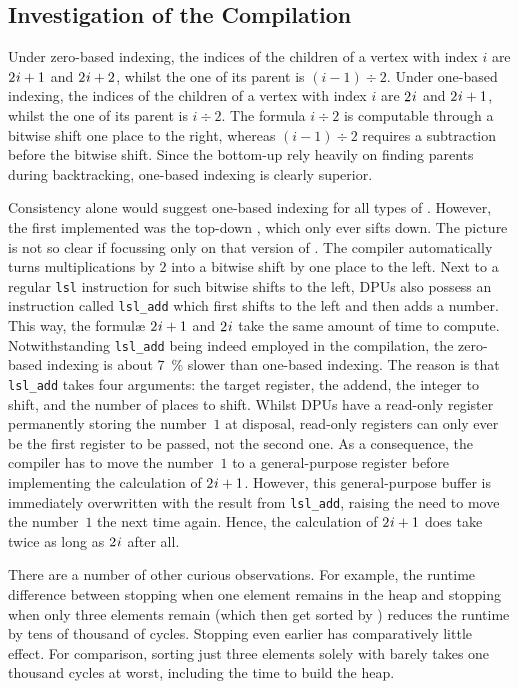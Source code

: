 \subsection{Investigation of the Compilation}
\label{sec:tasklet:heap:compilation}

Under zero-based indexing, the indices of the children of a vertex with index \(i\) are \(2 \mspace{1mu} i + 1\) and \(2 \mspace{1mu} i + 2\), whilst the one of its parent is \((i - 1) \div 2\).
Under one-based indexing, the indices of the children of a vertex with index \(i\) are \(2 \mspace{1mu} i\) and \(2 \mspace{1mu} i + 1\), whilst the one of its parent is \(i \div 2\).
The formula \(i \div 2\) is computable through a bitwise shift one place to the right, whereas \((i - 1) \div 2\) requires a subtraction before the bitwise shift.
Since the bottom-up \HS*{} rely heavily on finding parents during backtracking, one-based indexing is clearly superior.

Consistency alone would suggest one-based indexing for all types of \HS{}.
However, the first \HS{} implemented was the top-down \HS{}, which only ever sifts down.
The picture is not so clear if focussing only on that version of \HS{}.
The compiler automatically turns multiplications by \(2\) into a bitwise shift by one place to the left.
Next to a regular \lstinline|lsl| instruction for such bitwise shifts to the left, \acp{DPU} also possess an instruction called \lstinline|lsl_add| which first shifts to the left and then adds a number.
This way, the formulæ \(2 \mspace{1mu} i + 1\) and \(2 \mspace{1mu} i\) take the same amount of time to compute.
Notwithstanding \lstinline|lsl_add| being indeed employed in the compilation, the zero-based indexing is about \qty{7}{\percent} slower than one-based indexing.
The reason is that \lstinline|lsl_add| takes four arguments:
the target register, the addend, the integer to shift, and the number of places to shift.
Whilst \acp{DPU} have a read-only register permanently storing the number~\(1\) at disposal, read-only registers can only ever be the first register to be passed, not the second one.
As a consequence, the compiler has to move the number~\(1\) to a general-purpose register before implementing the calculation of \(2 \mspace{1mu} i + 1\).
However, this general-purpose buffer is immediately overwritten with the result from \lstinline|lsl_add|, raising the need to move the number~\(1\) the next time again.
Hence, the calculation of \(2 \mspace{1mu} i + 1\) does take twice as long as \(2 \mspace{1mu} i\) after all.

There are a number of other curious observations.
For example, the runtime difference between stopping \HS{} when one element remains in the heap and stopping \HS{} when only three elements remain (which then get sorted by \IS{}) reduces the runtime by tens of thousand of cycles.
Stopping \HS{} even earlier has comparatively little effect.
For comparison, sorting just three elements solely with \HS{} barely takes one thousand cycles at worst, including the time to build the heap.

